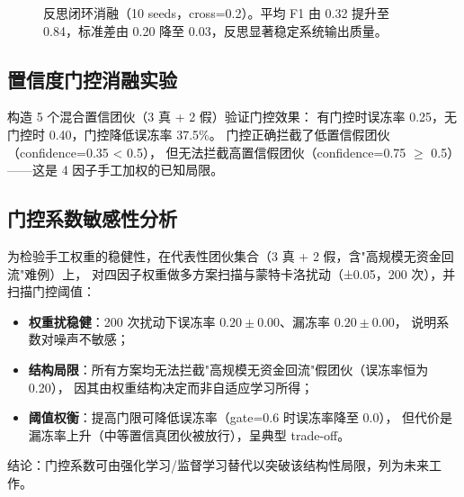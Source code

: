\documentclass[12pt,a4paper]{ctexart}
\begin{document}
\begin{figure}[H]
  \centering
  \caption{反思闭环消融（10 seeds，cross=0.2）。平均 F1 由 0.32 提升至 0.84，标准差由 0.20 降至 0.03，反思显著稳定系统输出质量。}
  \label{fig:reflection-ablation}
\end{figure}

\subsection{置信度门控消融实验}

构造 5 个混合置信团伙（3 真 + 2 假）验证门控效果：
有门控时误冻率 0.25，无门控时 0.40，门控降低误冻率 37.5\%。
门控正确拦截了低置信假团伙（confidence=0.35 < 0.5），
但无法拦截高置信假团伙（confidence=0.75 $\ge$ 0.5）——这是 4 因子手工加权的已知局限。

\subsection{门控系数敏感性分析}

为检验手工权重的稳健性，在代表性团伙集合（3 真 + 2 假，含"高规模无资金回流"难例）上，
对四因子权重做多方案扫描与蒙特卡洛扰动（±0.05，200 次），并扫描门控阈值：
\begin{itemize}
  \item \textbf{权重扰稳健}：200 次扰动下误冻率 $0.20\pm0.00$、漏冻率 $0.20\pm0.00$，
    说明系数对噪声不敏感；
  \item \textbf{结构局限}：所有方案均无法拦截"高规模无资金回流"假团伙（误冻率恒为 0.20），
    因其由权重结构决定而非自适应学习所得；
  \item \textbf{阈值权衡}：提高门限可降低误冻率（gate=0.6 时误冻率降至 0.0），
    但代价是漏冻率上升（中等置信真团伙被放行），呈典型 trade-off。
\end{itemize}
结论：门控系数可由强化学习/监督学习替代以突破该结构性局限，列为未来工作。
\end{document}
